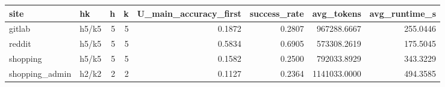 \begin{tabular}{llrrrrrr}
\toprule
site & hk & h & k & U_main_accuracy_first & success_rate & avg_tokens & avg_runtime_s \\
\midrule
gitlab & h5/k5 & 5 & 5 & 0.1872 & 0.2807 & 967288.6667 & 255.0446 \\
reddit & h5/k5 & 5 & 5 & 0.5834 & 0.6905 & 573308.2619 & 175.5045 \\
shopping & h5/k5 & 5 & 5 & 0.1582 & 0.2500 & 792033.8929 & 343.3229 \\
shopping_admin & h2/k2 & 2 & 2 & 0.1127 & 0.2364 & 1141033.0000 & 494.3585 \\
\bottomrule
\end{tabular}
